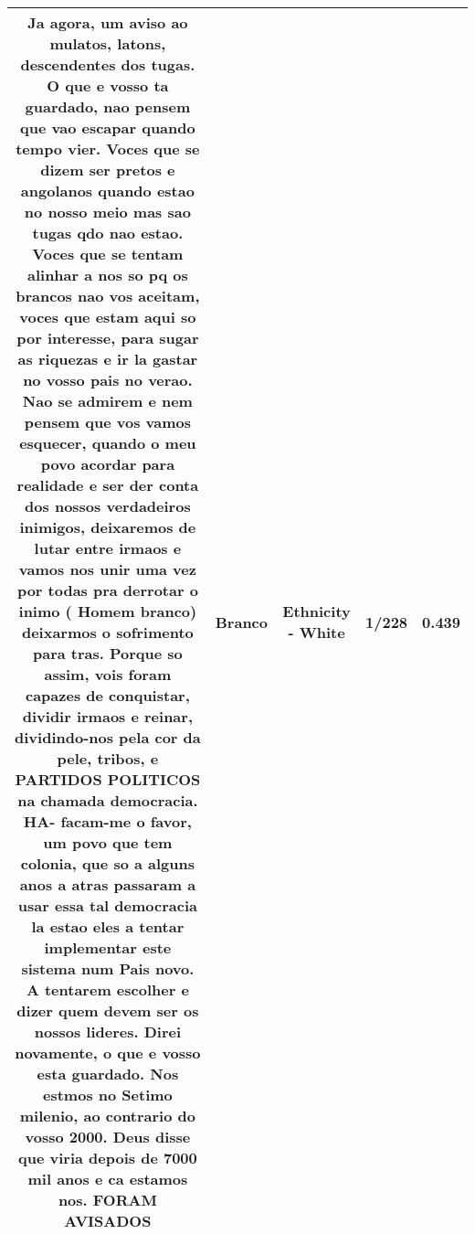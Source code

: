 \documentclass[11pt]{article}
\newlength\mylength
\begin{document}
\begin{center}
\begin{longtable}{|C{.65\mylength}|C{.30\mylength}|C{.12\mylength}|C{.12\mylength}|C{.12\mylength}|}
  \small Ja agora, um aviso ao mulatos, latons, descendentes dos tugas. O que e vosso ta guardado, nao pensem que vao escapar quando tempo vier. Voces que se dizem ser pretos e angolanos quando estao no nosso meio mas sao tugas qdo nao estao. Voces que se tentam alinhar a nos so pq os brancos nao vos aceitam, voces que estam aqui so por interesse, para sugar as riquezas e ir la gastar no vosso pais no verao. Nao se admirem e nem pensem que vos vamos esquecer, quando o meu povo acordar para realidade e ser der conta dos nossos verdadeiros inimigos, deixaremos de lutar entre irmaos e vamos nos unir uma vez por todas pra derrotar o inimo ( Homem \textbf{branco}) deixarmos o sofrimento para tras. Porque so assim, vois foram capazes de conquistar, dividir irmaos e reinar, dividindo-nos pela cor da pele, tribos, e PARTIDOS POLITICOS na chamada democracia. HA- facam-me o favor, um povo que tem colonia, que so a alguns anos a atras  passaram a usar essa tal democracia la estao eles a tentar implementar este sistema num Pais novo. A tentarem escolher e dizer quem devem ser os nossos lideres. Direi novamente, o que e vosso esta guardado. Nos estmos no Setimo milenio, ao contrario do vosso 2000. Deus disse que viria depois de 7000 mil anos e ca estamos nos. FORAM AVISADOS\normalsize   & Branco & Ethnicity - White & 1/228 & 0.439 \\  \hline

\end{longtable}
\end{center}
\end{document}
